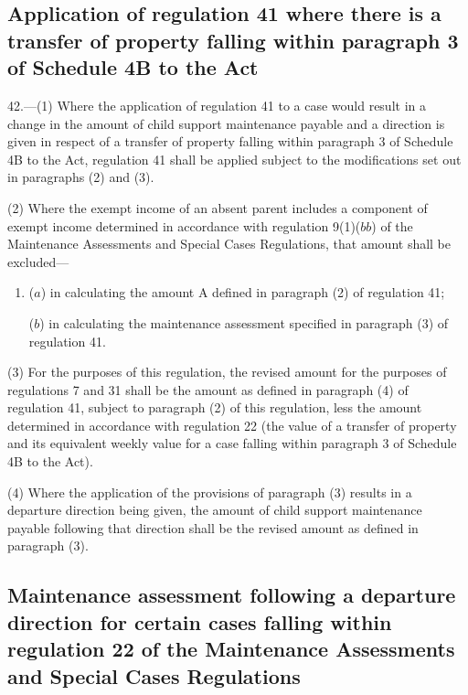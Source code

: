 \documentclass[a4paper]{article}
\begin{document}
\subsection[42. Application of regulation 41 where there is a transfer of property falling
within paragraph 3 of Schedule 4B to the Act]{Application of regulation 41 where there is a transfer of property falling
within paragraph 3 of Schedule 4B to the Act}

42.—(1) Where the application of
regulation 41 to a case would result in a change in the amount of child support
maintenance payable and a direction is given in respect of a transfer of
property falling within paragraph 3 of Schedule 4B to the Act, regulation 41
shall be applied subject to the modifications set out in paragraphs (2) and (3).

(2) Where the exempt income of an absent parent includes a component of exempt
income determined in accordance with regulation 9(1)($bb$) of the Maintenance
Assessments and Special Cases Regulations, that amount shall be excluded—
\begin{enumerate}\item[]
($a$) in calculating the amount A defined in paragraph (2) of regulation 41;

($b$) in calculating the maintenance assessment specified in paragraph (3) of
regulation 41.
\end{enumerate}

(3) For the purposes of this regulation, the revised amount for the purposes of
regulations 7 and 31 shall be the amount as defined in paragraph (4) of
regulation 41, subject to paragraph (2) of this regulation, less the amount
determined in accordance with regulation 22 (the value of a transfer of property
and its equivalent weekly value for a case falling within paragraph 3 of
Schedule 4B to the Act).

(4) Where the application of the provisions of paragraph (3) results in a
departure direction being given, the amount of child support maintenance payable
following that direction shall be the revised amount as defined in paragraph
(3).

\subsection[43. Maintenance assessment following a departure direction for certain cases falling
within regulation 22 of the Maintenance Assessments and Special Cases
Regulations]{Maintenance assessment following a departure direction for certain cases falling
within regulation 22 of the Maintenance Assessments and Special Cases
Regulations}
\end{document}
